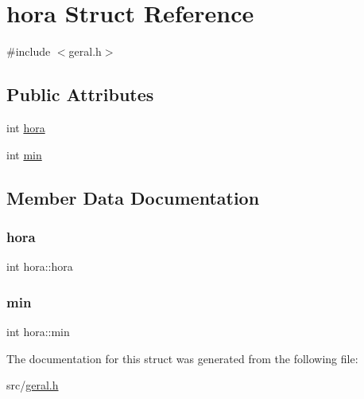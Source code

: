 \hypertarget{structhora}{}\section{hora Struct Reference}
\label{structhora}


{\ttfamily \#include $<$geral.\+h$>$}

\subsection*{Public Attributes}
\begin{DoxyCompactItemize}
\item 
int \mbox{\hyperlink{structhora_a2bc5ffcfccaf2f268026a405a03ed80a}{hora}}
\item 
int \mbox{\hyperlink{structhora_a777dfe8ee56643fd53a26f83fa70dcec}{min}}
\end{DoxyCompactItemize}


\subsection{Member Data Documentation}
\mbox{\label{structhora_a2bc5ffcfccaf2f268026a405a03ed80a}} 
\subsubsection{\texorpdfstring{hora}{hora}}
{\footnotesize\ttfamily int hora\+::hora}

\mbox{\label{structhora_a777dfe8ee56643fd53a26f83fa70dcec}} 
\subsubsection{\texorpdfstring{min}{min}}
{\footnotesize\ttfamily int hora\+::min}



The documentation for this struct was generated from the following file\+:\begin{DoxyCompactItemize}
\item 
src/\mbox{\hyperlink{geral_8h}{geral.\+h}}\end{DoxyCompactItemize}
